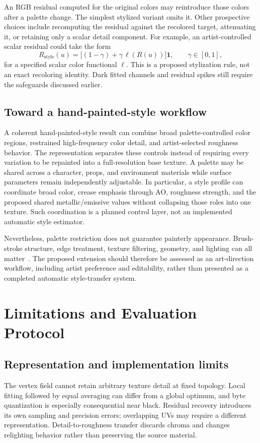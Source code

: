 \documentclass[11pt,letterpaper]{article}
\newcommand{\one}{\mathbf{1}}
\begin{document}
An RGB residual computed for the original colors may reintroduce those colors after a palette change. The simplest stylized variant omits it. Other prospective choices include recomputing the residual against the recolored target, attenuating it, or retaining only a scalar detail component. For example, an artist-controlled scalar residual could take the form
\begin{equation}
R_{\mathrm{style}}(u)=\bigl[(1-\gamma)+\gamma\,\ell(R(u))\bigr]\one,
\qquad \gamma\in[0,1],
\label{eq:styleresidual}
\end{equation}
for a specified scalar color functional $\ell$. This is a proposed stylization rule, not an exact recoloring identity. Dark fitted channels and residual spikes still require the safeguards discussed earlier.

\subsection{Toward a hand-painted-style workflow}
A coherent hand-painted-style result can combine broad palette-controlled color regions, restrained high-frequency color detail, and artist-selected roughness behavior. The representation separates these controls instead of requiring every variation to be repainted into a full-resolution base texture. A palette may be shared across a character, props, and environment materials while surface parameters remain independently adjustable. In particular, a style profile can coordinate broad color, crease emphasis through AO, roughness strength, and the proposed shared metallic/emissive values without collapsing those roles into one texture. Such coordination is a planned control layer, not an implemented automatic style estimator.

Nevertheless, palette restriction does not guarantee painterly appearance. Brush-stroke structure, edge treatment, texture filtering, geometry, and lighting can all matter~\cite{hertzmann1998}. The proposed extension should therefore be assessed as an art-direction workflow, including artist preference and editability, rather than presented as a completed automatic style-transfer system.

\section{Limitations and Evaluation Protocol}
\subsection{Representation and implementation limits}
The vertex field cannot retain arbitrary texture detail at fixed topology. Local fitting followed by equal averaging can differ from a global optimum, and byte quantization is especially consequential near black. Residual recovery introduces its own sampling and precision errors; overlapping UVs may require a different representation. Detail-to-roughness transfer discards chroma and changes relighting behavior rather than preserving the source material.
\end{document}
